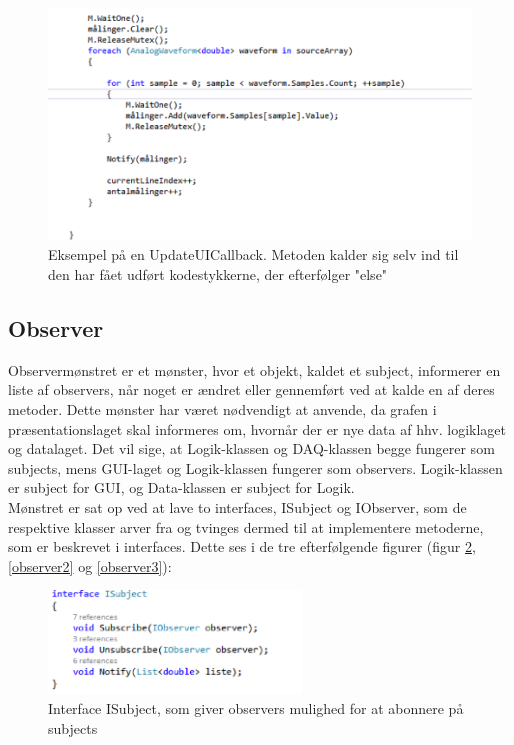 \begin{figure}[H]
	\centering
	\includegraphics[width=1.1\textwidth]{Figurer/SoftwareImplementering/mutex}
	\caption{Eksempel på en UpdateUICallback. Metoden kalder sig selv ind til den har fået udført kodestykkerne, der efterfølger "else"\ }
	\label{mutex}
\end{figure}


\subsection{Observer}
Observermønstret er et mønster, hvor et objekt, kaldet et subject, informerer en liste af observers, når noget er ændret eller gennemført ved at kalde en af deres metoder. Dette mønster har været nødvendigt at anvende, da grafen i præsentationslaget skal informeres om, hvornår der er nye data af hhv. logiklaget og datalaget. Det vil sige, at Logik-klassen og DAQ-klassen begge fungerer som subjects, mens GUI-laget og Logik-klassen fungerer som observers. Logik-klassen er subject for GUI, og Data-klassen er subject for Logik.\\
Mønstret er sat op ved at lave to interfaces, ISubject og IObserver, som de respektive klasser arver fra og tvinges dermed til at implementere metoderne, som er beskrevet i interfaces. Dette ses i de tre efterfølgende figurer (figur \ref{observer1},\ref{observer2} og \ref{observer3}):

\begin{figure}[H]
	\centering
	\includegraphics[width=0.6\textwidth]{Figurer/SoftwareImplementering/observer1}
	\caption{Interface ISubject, som giver observers mulighed for at abonnere på subjects}
	\label{observer1}
\end{figure}

